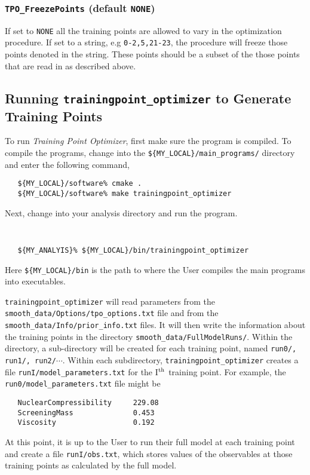\documentclass[UserManual.tex]{subfiles}
\begin{document}
\subsubsection{{\tt TPO\_FreezePoints} (default {\tt NONE})}
If set to {\tt NONE} all the training points are allowed to vary in the optimization procedure. If set to a string, e.g {\tt 0-2,5,21-23}, the procedure will freeze those points denoted in the string. These points should be a subset of the those points that are read in as described above.
 
\subsection{Running {\tt trainingpoint\_optimizer} to Generate Training Points}

To run {\it Training Point Optimizer}, first make sure the program is compiled. To compile the programs, change into the {\tt \$\{MY\_LOCAL\}/main\_programs/} directory and enter the following command,

\begin{verbatim}
   ${MY_LOCAL}/software% cmake .
   ${MY_LOCAL}/software% make trainingpoint_optimizer
\end{verbatim}

Next, change into your analysis directory and run the program.
{\tt
\begin{verbatim}
   ${MY_ANALYIS}% ${MY_LOCAL}/bin/trainingpoint_optimizer 
\end{verbatim}
}
Here {\tt \$\{MY\_LOCAL\}/bin} is the path to where the User compiles the main programs into executables. 

{\tt trainingpoint\_optimizer} will read parameters from the {\tt smooth\_data/Options/tpo\_options.txt} file and from the {\tt smooth\_data/Info/prior\_info.txt} files. It will then write the information about the training points in the directory {\tt smooth\_data/FullModelRuns/}. Within the directory, a sub-directory will be created for each training point, named {\tt run0/, run1/, run2/}$\cdots$. Within each subdirectory, {\tt trainingpoint\_optimizer} creates a file {\tt runI/model\_parameters.txt} for the I$^{\rm th}$ training point. For example, the {\tt run0/model\_parameters.txt} file might be
{\tt\begin{verbatim}
   NuclearCompressibility     229.08
   ScreeningMass              0.453
   Viscosity                  0.192
\end{verbatim}
}
At this point, it is up to the User to run their full model at each training point and create a file {\tt runI/obs.txt}, which stores values of the observables at those training points as calculated by the full model. 
\end{document}
